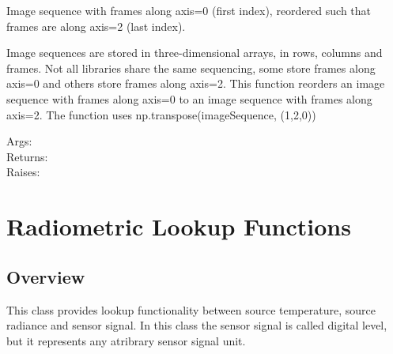 \documentclass[a4paper,10pt,english]{sphinxmanual}
\begin{document}
\begin{fulllineitems}
\label{ryutils:pyradi.ryutils.framesLast}
Image sequence with frames along axis=0 (first index), reordered such that 
frames are along axis=2 (last index).

Image sequences are stored in three-dimensional arrays, in rows, columns and frames.
Not all libraries share the same sequencing, some store frames along axis=0 and 
others store frames along axis=2.  This function reorders an image sequence with 
frames along axis=0  to an image sequence with frames along axis=2.  The function
uses np.transpose(imageSequence, (1,2,0))
\begin{description}
\item[{Args:}] \leavevmode
{}

\item[{Returns:}] \leavevmode
{}

\item[{Raises:}] \leavevmode
{}

\end{description}

\end{fulllineitems}



\chapter{Radiometric Lookup Functions}
\label{rylookup:radiometric-lookup-functions}\label{rylookup::doc}

\section{Overview}
\label{rylookup:overview}\label{rylookup:module-pyradi.rylookup}
This class provides lookup functionality between source temperature,
source radiance and sensor signal.  In this class the sensor signal is called
digital level, but it represents any atribrary sensor signal unit.
\end{document}

